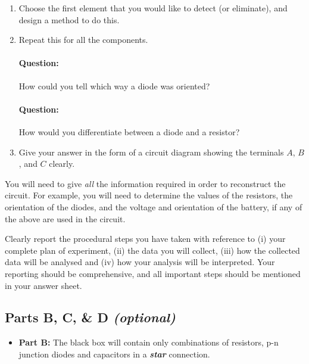 \begin{refsection}
\begin{enumerate}
    \item Choose the first element that you would like to detect (or eliminate), and design a method to do this.
    
    
    \item Repeat this for all the components.
    
    \begin{question}
    \paragraph{Question:} How could you tell which way a diode was oriented? 

    \paragraph{Question:} How would you differentiate between a diode and a resistor?
\end{question}
    
    \item Give your answer in the form of a circuit diagram showing the terminals $A$, $B$, and $C$ clearly. 
\end{enumerate}

\begin{tip}
You will need to give \textit{all} the information required in order to reconstruct the circuit. For example, you will need to determine the values of the resistors, the orientation of the diodes, and the voltage and orientation of the battery, if any of the above are used in the circuit.
\end{tip}

\begin{imp}
Clearly report the procedural steps you have taken with reference to (i) your complete plan of experiment, (ii) the data you will collect, (iii) how the collected data will be analysed and (iv) how your analysis will be interpreted. Your reporting should be comprehensive, and all important steps should be mentioned in your answer sheet.
\end{imp}

\subsection*{Parts B, C, \& D \textit{(optional)}}

\begin{itemize}
    \item \textbf{Part B:} The black box will contain only combinations of resistors, p-n junction diodes and capacitors in a \textit{\textbf{star}} connection. 
    

\end{itemize}
\end{refsection}
